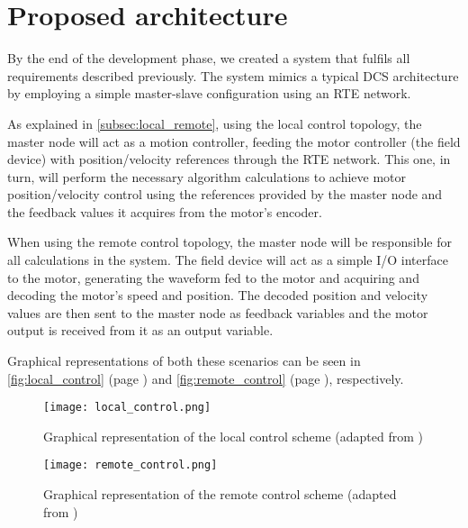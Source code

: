 \section{Proposed architecture} \label{sec:proposed-arch}

By the end of the development phase, we created a system that fulfils all requirements described previously.
The system mimics a typical DCS architecture by employing a simple master-slave configuration using an RTE network.

As explained in \autoref{subsec:local_remote}, using the local control topology, the master node will act as a motion controller, feeding the motor controller (the field device) with position/velocity references through the RTE network.
This one, in turn, will perform the necessary algorithm calculations to achieve motor position/velocity control using the references provided by the master node and the feedback values it acquires from the motor's encoder.

When using the remote control topology, the master node will be responsible for all calculations in the system.
The field device will act as a simple I/O interface to the motor, generating the waveform fed to the motor and acquiring and decoding the motor's speed and position.
The decoded position and velocity values are then sent to the master node as feedback variables and the motor output is received from it as an output variable.

Graphical representations of both these scenarios can be seen in \autoref{fig:local_control} (page \pageref{fig:local_control}) and \autoref{fig:remote_control} (page \pageref{fig:remote_control}), respectively. 


\begin{figure}[htp]
	\centering
	\texttt{[image: local\_control.png]}
	\caption{Graphical representation of the local control scheme (adapted from \cite{rte:motion-control-over-rte})}
	\label{fig:local_control}
\end{figure}

\begin{figure}[htp]
	\centering
	\texttt{[image: remote\_control.png]}
	\caption{Graphical representation of the remote control scheme (adapted from \cite{rte:motion-control-over-rte})}
	\label{fig:remote_control}
\end{figure}





